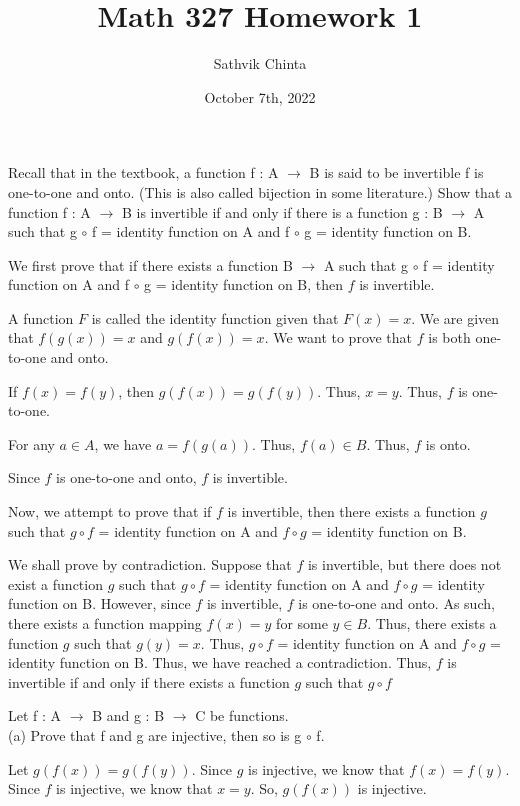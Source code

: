 \documentclass[addpoints]{exam}
\title{Math 327 Homework 1}
\author{Sathvik Chinta}
\date{October 7th, 2022}
\begin{document}
\maketitle

\begin{questions}
\question Recall that in the textbook, a function f : A $\rightarrow$ B is said to be
invertible f is one-to-one and onto. (This is also called bijection in some literature.)
Show that a function f : A $\rightarrow$ B is invertible if and only if there is a function g :
B $\rightarrow$ A such that g $\circ$ f = identity function on A and f $\circ$ g = identity 
function on B.

We first prove that if there exists a function B $\rightarrow$ A such that g $\circ$ 
f = identity function on A and f $\circ$ g = identity function on B, then $f$ is invertible.

A function $F$ is called the identity function given that $F(x) = x$. We are given that $f(g(x)) 
= x$ and $g(f(x)) = x$. We want to prove that $f$ is both one-to-one and onto. 

If $f(x) = f(y)$, then $g(f(x)) = g(f(y))$. Thus, $x = y$. Thus, $f$ is one-to-one.

For any $a \in A$, we have $a = f(g(a))$. Thus, $f(a) \in B$. Thus, $f$ is onto.

Since $f$ is one-to-one and onto, $f$ is invertible.

Now, we attempt to prove that if $f$ is invertible, then there exists a function $g$ such that 
$g \circ f$ = identity function on A and $f \circ g$ = identity function on B.

We shall prove by contradiction. Suppose that $f$ is invertible, but there does not exist a
function $g$ such that $g \circ f$ = identity function on A and $f \circ g$ = identity function
on B. However, since $f$ is invertible, $f$ is one-to-one and onto. As such, there exists a function 
mapping $f(x) = y$ for some $y \in B$. Thus, there exists a function $g$ such that $g(y) = x$. Thus, 
$g \circ f$ = identity function on A and $f \circ g$ = identity function on B. Thus, we have reached a
contradiction. Thus, $f$ is invertible if and only if there exists a function $g$ such that $g \circ f$


\question Let f : A $\rightarrow$ B and g : B $\rightarrow$ C be functions.\\
(a) Prove that f and g are injective, then so is g $\circ$ f. 

Let $g(f(x)) = g(f(y))$. Since $g$ is injective, we know that $f(x) = f(y)$. Since $f$ is injective,
we know that $x = y$. So, $g(f(x))$ is injective.


\end{questions}
\end{document}
